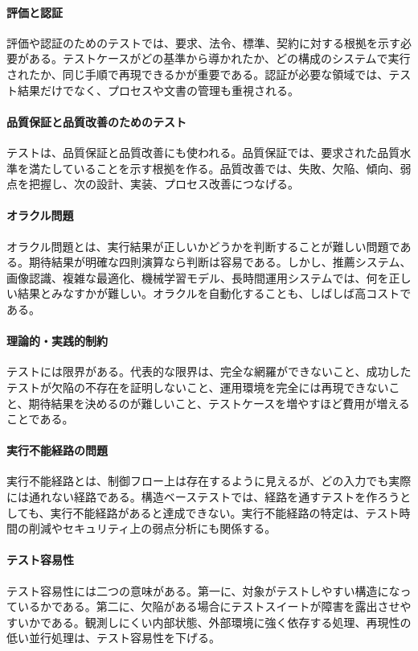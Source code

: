 \documentclass[a4paper,11pt]{ltjsarticle}
\numberwithin{figure}{section}
\numberwithin{table}{section}
\begin{document}
\paragraph{評価と認証}
評価や認証のためのテストでは、要求、法令、標準、契約に対する根拠を示す必要がある。テストケースがどの基準から導かれたか、どの構成のシステムで実行されたか、同じ手順で再現できるかが重要である。認証が必要な領域では、テスト結果だけでなく、プロセスや文書の管理も重視される。

\paragraph{品質保証と品質改善のためのテスト}
テストは、品質保証と品質改善にも使われる。品質保証では、要求された品質水準を満たしていることを示す根拠を作る。品質改善では、失敗、欠陥、傾向、弱点を把握し、次の設計、実装、プロセス改善につなげる。

\paragraph{オラクル問題}
オラクル問題とは、実行結果が正しいかどうかを判断することが難しい問題である。期待結果が明確な四則演算なら判断は容易である。しかし、推薦システム、画像認識、複雑な最適化、機械学習モデル、長時間運用システムでは、何を正しい結果とみなすかが難しい。オラクルを自動化することも、しばしば高コストである。

\paragraph{理論的・実践的制約}
テストには限界がある。代表的な限界は、完全な網羅ができないこと、成功したテストが欠陥の不存在を証明しないこと、運用環境を完全には再現できないこと、期待結果を決めるのが難しいこと、テストケースを増やすほど費用が増えることである。

\paragraph{実行不能経路の問題}
実行不能経路とは、制御フロー上は存在するように見えるが、どの入力でも実際には通れない経路である。構造ベーステストでは、経路を通すテストを作ろうとしても、実行不能経路があると達成できない。実行不能経路の特定は、テスト時間の削減やセキュリティ上の弱点分析にも関係する。

\paragraph{テスト容易性}
テスト容易性には二つの意味がある。第一に、対象がテストしやすい構造になっているかである。第二に、欠陥がある場合にテストスイートが障害を露出させやすいかである。観測しにくい内部状態、外部環境に強く依存する処理、再現性の低い並行処理は、テスト容易性を下げる。
\end{document}
